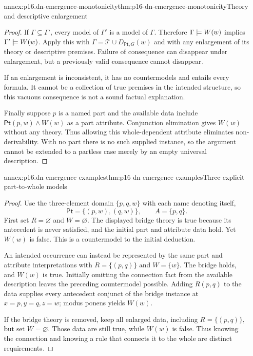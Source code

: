 \begin{annexitem}{annex:p16.dn-emergence-monotonicity}{thm:p16-dn-emergence-monotonicity}{Theory and descriptive enlargement}
\begin{proof}
If \(\Gamma\subseteq\Gamma'\),
every model of \(\Gamma'\)
is a model of \(\Gamma\).
Therefore \(\Gamma\models W(w)\)
implies \(\Gamma'\models W(w)\).
Apply this with
\(\Gamma=\mathcal T\cup D_{\mathsf{Pt},G}(w)\)
and with any enlargement of
its theory or descriptive
premises.
Failure of consequence can
disappear under enlargement,
but a previously valid
consequence cannot disappear.

If an enlargement is
inconsistent, it has no
countermodels and entails
every formula. It cannot
be a collection of true
premises in the intended
structure, so this vacuous
consequence is not a sound
factual explanation.

Finally suppose \(p\) is
a named part and the
available data include
\(\mathsf{Pt}(p,w)\land W(w)\)
as a part attribute.
Conjunction elimination gives
\(W(w)\) without any theory.
Thus allowing this
whole-dependent attribute
eliminates non-derivability.
With no part there is no
such supplied instance,
so the argument cannot be
extended to a partless case
merely by an empty universal
description.
\end{proof}
\end{annexitem}

\begin{annexitem}{annex:p16.dn-emergence-examples}{thm:p16-dn-emergence-examples}{Three explicit part-to-whole models}
\begin{proof}
Use the three-element domain
\(\{p,q,w\}\) with each
name denoting itself,
\[
 \mathsf{Pt}=\{(p,w),(q,w)\},
                       \qquad A=\{p,q\}.
\]
First set \(R=\varnothing\)
and \(W=\varnothing\).
The displayed bridge theory
is true because its antecedent
is never satisfied, and the
initial part and attribute
data hold. Yet \(W(w)\)
is false. This is a
countermodel to the initial
deduction.

An intended occurrence can
instead be represented by
the same part and attribute
interpretations with
\(R=\{(p,q)\}\) and
\(W=\{w\}\). The bridge
holds, and \(W(w)\) is
true. Initially omitting
the connection fact from
the available description
leaves the preceding
countermodel possible.
Adding \(R(p,q)\) to
the data supplies every
antecedent conjunct of
the bridge instance
at \(x=p,y=q,z=w\);
modus ponens yields \(W(w)\).

If the bridge theory is
removed, keep all enlarged
data, including
\(R=\{(p,q)\}\), but
set \(W=\varnothing\).
Those data are still true,
while \(W(w)\) is false.
Thus knowing the connection
and knowing a rule that
connects it to the whole
are distinct requirements.
\end{proof}
\end{annexitem}

